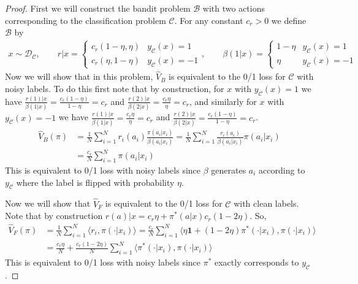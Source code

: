 \begin{proof}
First we will construct the bandit problem $ \mathcal{B}$ with two actions corresponding to the classification problem $ \mathcal{C}$.
For any constant $ c_r > 0 $ we define $ \mathcal{B}$ by
\begin{align}
    x \sim \mathcal{D}_{\mathcal{C}}, \qquad r|x = \begin{cases}c_r(1-\eta, \eta) & y_\mathcal{C}(x) = 1\\ c_r(\eta, 1-\eta) & y_\mathcal{C}(x) = -1\end{cases}, \qquad \beta(1|x) = \begin{cases}1-\eta & y_\mathcal{C}(x) = 1\\ \eta & y_\mathcal{C}(x) = -1\end{cases}
\end{align}
Now we will show that in this problem, $ \hat V_B$ is equivalent to the 0/1 loss for $ \mathcal{C}$ with noisy labels. To do this first note that by construction, for $ x $ with $ y_\mathcal{C}(x) = 1$ we have $ \frac{r(1)|x}{\beta(1|x)} = \frac{c_r(1-\eta)}{1-\eta} = c_r$ and $ \frac{r(2)|x}{\beta(2|x)} = \frac{c_r\eta}{\eta} = c_r$, and similarly for $ x $ with $ y_\mathcal{C}(x) = -1$ we have $ \frac{r(1)|x}{\beta(1|x)} = \frac{c_r\eta}{\eta} = c_r$ and $ \frac{r(2)|x}{\beta(2|x)} = \frac{c_r(1-\eta)}{1-\eta} = c_r$.
\begin{align}
    \hat V_B(\pi) &= \frac{1}{N} \sum_{i=1}^N r_i(a_i) \frac{\pi(a_i|x_i)}{\beta(a_i|x_i)} = \frac{1}{N} \sum_{i=1}^N  \frac{r_i(a_i)}{\beta(a_i|x_i)} \pi(a_i|x_i) \\
    &= \frac{c_r}{N} \sum_{i=1}^N  \pi(a_i|x_i)
\end{align}
This is equivalent to 0/1 loss with noisy labels since $ \beta$ generates $ a_i$ according to $ y_\mathcal{C}$ where the label is flipped with probability $ \eta$.

Now we will show that $ \hat V_F$ is equivalent to the 0/1 loss for $ \mathcal{C}$ with clean labels. Note that by construction $ r(a)|x = c_r \eta + \pi^*(a|x)c_r (1 - 2 \eta)$. So,
\begin{align}
    \hat V_F(\pi) &= \frac{1}{N} \sum_{i=1}^N \langle r_i, \pi(\cdot|x_i)\rangle = \frac{c_r}{N} \sum_{i=1}^N \langle \eta \textbf{1} + (1 - 2\eta) \pi^*(\cdot|x_i), \pi(\cdot|x_i)\rangle \\
    &= \frac{c_r \eta}{N} +  \frac{c_r (1 - 2\eta)}{N} \sum_{i=1}^N \langle  \pi^*(\cdot|x_i), \pi(\cdot|x_i)\rangle
\end{align}
This is equivalent to 0/1 loss with noisy labels since $ \pi^*$ exactly corresponds to $ y_\mathcal{C}$.
\end{proof}





